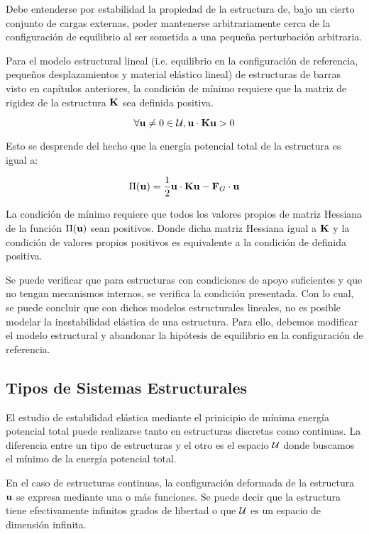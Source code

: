Debe entenderse por estabilidad la propiedad de la estructura de, bajo un cierto conjunto de cargas externas, poder mantenerse arbitrariamente cerca de la configuración de equilibrio al ser sometida a una pequeña perturbación arbitraria.

Para el modelo estructural lineal (i.e. equilibrio en la configuración de referencia, pequeños desplazamientos y material elástico lineal) de estructuras de barras visto en capítulos anteriores, la condición de mínimo requiere que la matriz de rigidez de la estructura ${\bf K}$ sea definida positiva.

$$\forall {\bf u}\neq 0 \in {\mathcal U}, {\bf u} \cdot {\bf K} {\bf u} > 0$$

Esto se desprende del hecho que la energía potencial total de la estructura es igual a:

$$\Pi({\bf u})= \frac{1}{2} {\bf u} \cdot {\bf K} {\bf u} - {\bf F}_G \cdot {\bf u}$$

La condición de mínimo requiere que todos los valores propios de matriz Hessiana de la función $\Pi({\bf u})$ sean positivos. Donde dicha matriz Hessiana igual a ${\bf K}$ y la condición de valores propios positivos es equivalente a la condición de definida positiva. 

Se puede verificar que para estructuras con condiciones de apoyo suficientes y que no tengan mecanismos internos, se verifica la condición presentada. Con lo cual, se puede concluir que con dichos modelos estructurales lineales, no es posible modelar la inestabilidad elástica de una estructura. Para ello, debemos modificar el modelo estructural y abandonar la hipótesis de equilibrio en la configuración de referencia.
 

\subsection{Tipos de Sistemas Estructurales} 

El estudio de estabilidad elástica mediante el prinicipio de mínima energía potencial total puede realizarse tanto en estructuras discretas como continuas. La diferencia entre un tipo de estructuras y el otro es el espacio ${\mathcal U}$ donde buscamos el mínimo de la energía potencial total.

En el caso de estructuras continuas, la configuración deformada de la estructura ${\bf u}$ se expresa mediante una o más funciones. Se puede decir que la estructura tiene efectivamente infinitos grados de libertad o que ${\mathcal U}$ es un espacio de dimensión infinita.


